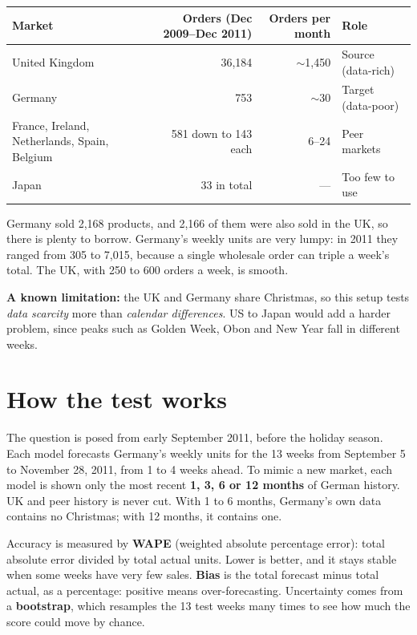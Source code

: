 \documentclass[11pt]{article}
\begin{document}
\begin{center}
\begin{tabularx}{\textwidth}{L r r l}
\toprule
Market & Orders (Dec 2009--Dec 2011) & Orders per month & Role \\
\midrule
United Kingdom & 36,184 & $\sim$1,450 & Source (data-rich) \\
Germany & 753 & $\sim$30 & Target (data-poor) \\
France, Ireland, Netherlands, Spain, Belgium & 581 down to 143 each & 6--24 & Peer markets \\
Japan & 33 in total & --- & Too few to use \\
\bottomrule
\end{tabularx}
\end{center}

Germany sold 2,168 products, and 2,166 of them were also sold in the UK, so there is plenty to borrow.
Germany's weekly units are very lumpy: in 2011 they ranged from 305 to 7,015, because a single wholesale
order can triple a week's total. The UK, with 250 to 600 orders a week, is smooth.

\textbf{A known limitation:} the UK and Germany share Christmas, so this setup tests \emph{data
scarcity} more than \emph{calendar differences}. US to Japan would add a harder problem, since peaks such
as Golden Week, Obon and New Year fall in different weeks.

\section{How the test works}

The question is posed from early September 2011, before the holiday season. Each model forecasts
Germany's weekly units for the 13 weeks from September 5 to November 28, 2011, from 1 to 4 weeks ahead.
To mimic a new market, each model is shown only the most recent \textbf{1, 3, 6 or 12 months} of German
history. UK and peer history is never cut. With 1 to 6 months, Germany's own data contains no Christmas;
with 12 months, it contains one.

Accuracy is measured by \textbf{WAPE} (weighted absolute percentage error): total absolute error divided
by total actual units. Lower is better, and it stays stable when some weeks have very few sales.
\textbf{Bias} is the total forecast minus total actual, as a percentage: positive means over-forecasting.
Uncertainty comes from a \textbf{bootstrap}, which resamples the 13 test weeks many times to see how much
the score could move by chance.
\end{document}
